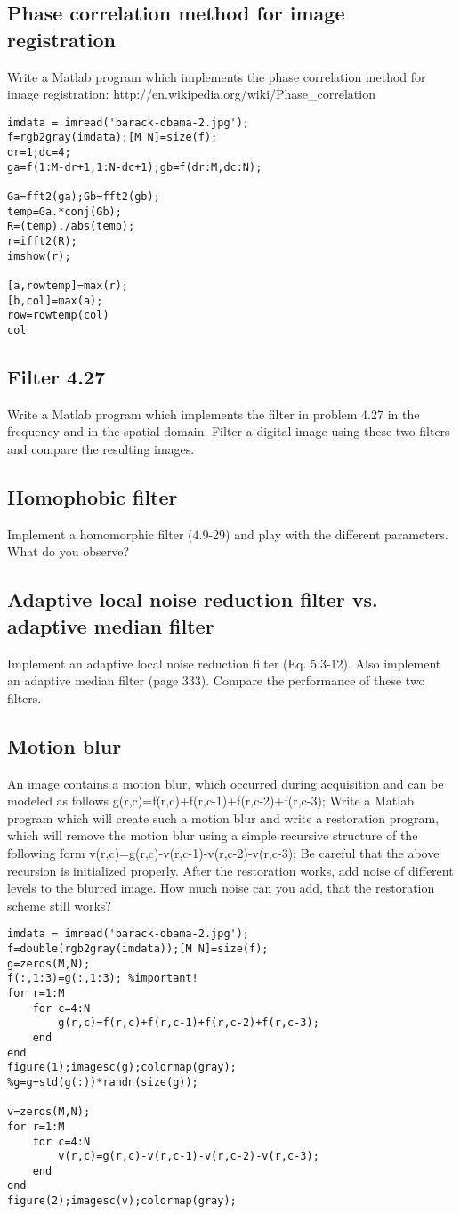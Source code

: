 \subsection{Phase correlation method for image registration}
Write a Matlab program which implements the phase correlation method for image
registration: http://en.wikipedia.org/wiki/Phase\_correlation
\begin{lstlisting}
imdata = imread('barack-obama-2.jpg');
f=rgb2gray(imdata);[M N]=size(f);
dr=1;dc=4;
ga=f(1:M-dr+1,1:N-dc+1);gb=f(dr:M,dc:N);

Ga=fft2(ga);Gb=fft2(gb);
temp=Ga.*conj(Gb);
R=(temp)./abs(temp);
r=ifft2(R);
imshow(r);

[a,rowtemp]=max(r);
[b,col]=max(a);
row=rowtemp(col)
col
\end{lstlisting}
\subsection{Filter 4.27}
Write a Matlab program which implements the filter in problem 4.27 in the
frequency and in the spatial domain. Filter a digital image using these two filters and compare the resulting images.
\subsection{Homophobic filter}
Implement a homomorphic filter (4.9-29) and play with the different parameters.
What do you observe?
\subsection{Adaptive local noise reduction filter vs. adaptive median filter}
Implement an adaptive local noise reduction filter (Eq. 5.3-12). Also implement
an adaptive median filter (page 333). Compare the performance of these two filters.
\subsection{Motion blur}
An image contains a motion blur, which occurred during acquisition and can be modeled as follows g(r,c)=f(r,c)+f(r,c-1)+f(r,c-2)+f(r,c-3);
Write a Matlab program which will create such a motion blur and write a restoration program, which will remove the motion blur using a simple recursive structure of the following form  v(r,c)=g(r,c)-v(r,c-1)-v(r,c-2)-v(r,c-3);
Be careful that the above recursion is initialized properly. After the restoration works, add noise of different levels to the blurred image. How much noise can you add, that the restoration scheme still works?
\begin{lstlisting}
imdata = imread('barack-obama-2.jpg');
f=double(rgb2gray(imdata));[M N]=size(f);
g=zeros(M,N);
f(:,1:3)=g(:,1:3); %important!
for r=1:M
    for c=4:N
        g(r,c)=f(r,c)+f(r,c-1)+f(r,c-2)+f(r,c-3);
    end
end
figure(1);imagesc(g);colormap(gray);
%g=g+std(g(:))*randn(size(g));

v=zeros(M,N);
for r=1:M
    for c=4:N
        v(r,c)=g(r,c)-v(r,c-1)-v(r,c-2)-v(r,c-3);
    end
end
figure(2);imagesc(v);colormap(gray);
\end{lstlisting}
